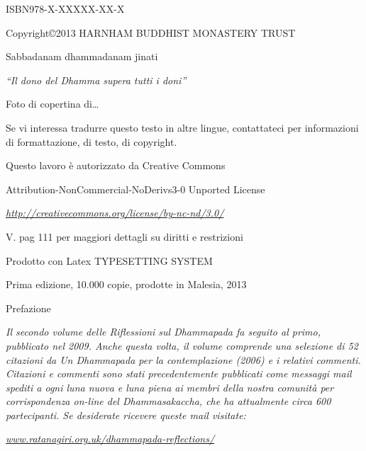\documentclass[a4paper,portrait,12pt]{article}
\begin{document}
ISBN978-X-XXXXX-XX-X


Copyright©2013 HARNHAM BUDDHIST MONASTERY TRUST


\newpage



Sabbadanam dhammadanam jinati


\emph{``Il dono del Dhamma supera tutti i doni''}





Foto di copertina di\ldots{}





Se vi interessa tradurre questo testo in altre lingue, contattateci per informazioni di formattazione, di testo, di copyright.





Questo lavoro \`{e} autorizzato da Creative Commons


Attribution-NonCommercial-NoDerivs3-0 Unported License


\href{http://creativecommons.org/license/by-nc-nd/3.0/}{\emph{http://creativecommons.org/license/by-nc-nd/3.0/}}





V. pag 111 per maggiori dettagli su diritti e restrizioni





Prodotto con Latex TYPESETTING SYSTEM





Prima edizione, 10.000 copie, prodotte in Malesia, 2013


\newpage



Prefazione





\emph{   Il secondo volume delle Riflessioni sul Dhammapada fa seguito al primo, pubblicato nel 2009. Anche questa volta, il volume comprende una selezione di 52 citazioni da Un Dhammapada per la contemplazione (2006) e i relativi commenti. Citazioni e commenti sono stati precedentemente pubblicati come messaggi mail spediti a ogni luna nuova e luna piena ai membri della nostra comunit\`{a} per corrispondenza on-line del Dhammasakaccha, che ha attualmente circa 600 partecipanti. Se desiderate ricevere queste mail visitate:}


\href{http://www.ratanagiri.org.uk/dhammapada-reflections/}{\emph{www.ratanagiri.org.uk/dhammapada-reflections/}}
\end{document}
